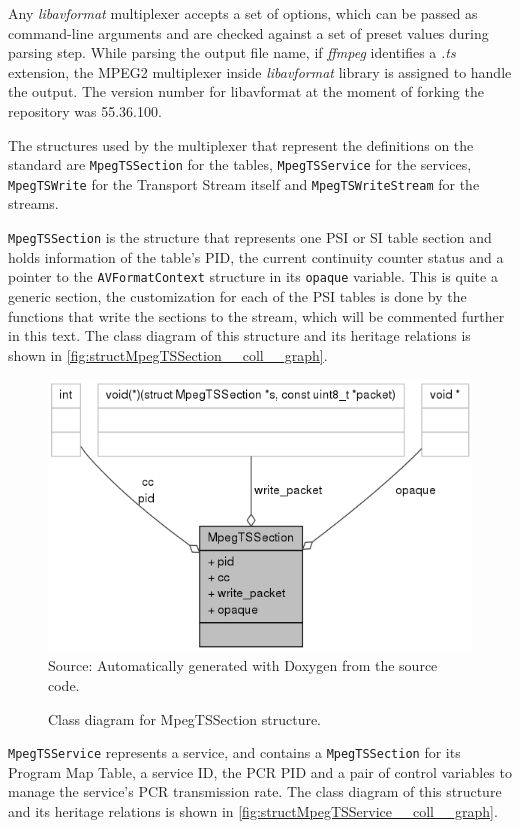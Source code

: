 \documentclass[
	12pt,				%
	openright,			%
	twoside,			%
	a4paper,			%
	brazil,
	french,				%
	english
	]{abntex2}
\begin{document}
Any \textit{libavformat} multiplexer accepts a set of options, which can be passed as command-line arguments and are checked against a set of preset values during parsing step. While parsing the output file name, if \textit{ffmpeg} identifies a \textit{.ts} extension, the MPEG2 multiplexer inside \textit{libavformat} library is assigned to handle the output. The version number for libavformat at the moment of forking the repository was 55.36.100.

The structures used by the multiplexer that represent the definitions on the standard are \texttt{MpegTSSection} for the tables, \texttt{MpegTSService} for the services, \texttt{MpegTSWrite} for the Transport Stream itself and \texttt{MpegTSWriteStream} for the streams.

\texttt{MpegTSSection} is the structure that represents one PSI or SI table section and holds information of the table's PID, the current continuity counter status and a pointer to the \texttt{AVFormatContext} structure in its \texttt{opaque} variable. This is quite a generic section, the customization for each of the PSI tables is done by the functions that write the sections to the stream, which will be commented further in this text. The class diagram of this structure and its heritage relations is shown in \autoref{fig:structMpegTSSection__coll__graph}.

\begin{figure}[!b]
\centering
\caption{Class diagram for MpegTSSection structure.}
\includegraphics[width=0.8\linewidth]{figuras/structMpegTSSection__coll__graph.png}
\\Source: Automatically generated with Doxygen from the source code.
\label{fig:structMpegTSSection__coll__graph}
\end{figure}

\texttt{MpegTSService} represents a service, and contains a \texttt{MpegTSSection} for its Program Map Table, a service ID, the PCR PID and a pair of control variables to manage the service's PCR transmission rate. The class diagram of this structure and its heritage relations is shown in \autoref{fig:structMpegTSService__coll__graph}.
\end{document}
